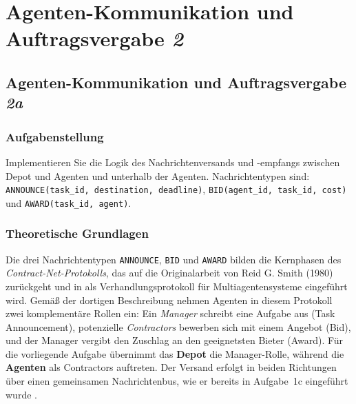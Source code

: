 
\chapter{Agenten-Kommunikation und Auftragsvergabe \textit{2}}
\label{chap:aufgabe2}
\thispagestyle{fancy}


\section{Agenten-Kommunikation und Auftragsvergabe \textit{2a}}
\label{sec:aufgabe2a}

\subsection{Aufgabenstellung}

Implementieren Sie die Logik des Nachrichtenversands und -empfangs zwischen Depot und Agenten und unterhalb der Agenten. Nachrichtentypen sind: \texttt{ANNOUNCE(task\_id, destination, deadline)}, \texttt{BID(agent\_id, task\_id, cost)} und \texttt{AWARD(task\_id, agent)}.

\subsection{Theoretische Grundlagen}

Die drei Nachrichtentypen \texttt{ANNOUNCE}, \texttt{BID} und \texttt{AWARD} bilden die Kernphasen des \textit{Contract-Net-Protokolls}, das auf die Originalarbeit von Reid G. Smith (1980) zurückgeht und in \textcite[S. 30\,ff.]{5} als Verhandlungsprotokoll für Multiagentensysteme eingeführt wird. Gemäß der dortigen Beschreibung nehmen Agenten in diesem Protokoll zwei komplementäre Rollen ein: Ein \textit{Manager} schreibt eine Aufgabe aus (Task Announcement), potenzielle \textit{Contractors} bewerben sich mit einem Angebot (Bid), und der Manager vergibt den Zuschlag an den geeignetsten Bieter (Award). Für die vorliegende Aufgabe übernimmt das \textbf{Depot} die Manager-Rolle, während die \textbf{Agenten} als Contractors auftreten. Der Versand erfolgt in beiden Richtungen über einen gemeinsamen Nachrichtenbus, wie er bereits in Aufgabe~1c eingeführt wurde \cite[S. 30]{5}.

